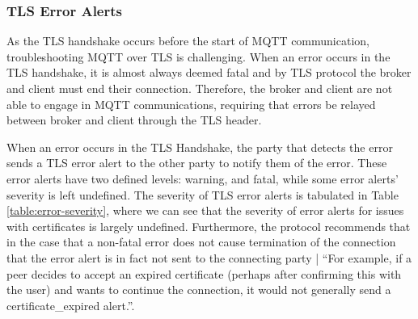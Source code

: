 \documentclass[12pt]{article}
\begin{document}
\subsubsection{TLS Error Alerts} \label{tls-errors}
As the TLS handshake occurs before the start of MQTT communication, troubleshooting MQTT over TLS is challenging. When an error occurs in the TLS handshake, it is almost always deemed fatal and by TLS protocol the broker and client must end their connection\cite{tls1.2errors}. Therefore, the broker and client are not able to engage in MQTT communications, requiring that errors be relayed between broker and client through the TLS header.\par
When an error occurs in the TLS Handshake, the party that detects the error sends a TLS error alert to the other party to notify them of the error. These error alerts have two defined levels: warning, and fatal, while some error alerts' severity is left undefined. The severity of TLS error alerts is tabulated in Table \ref{table:error-severity}, where we can see that the severity of error alerts for issues with certificates is largely undefined. Furthermore, the protocol recommends that in the case that a non-fatal error does not cause termination of the connection that the error alert is in fact not sent to the connecting party | ``For example, if a peer decides to accept an expired certificate (perhaps after confirming this with the user) and wants to continue the connection, it would not generally send a certificate\_expired alert.''\cite{tls1.2errors}. 
\end{document}
